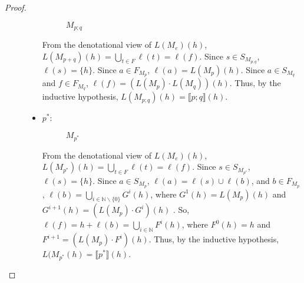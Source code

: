\documentclass{article}
\newcommand\den[1]{\llbracket #1\rrbracket}
\renewcommand\star{^{\textstyle *}}
\begin{document}
\begin{proof}
\begin{description}
\begin{itemize}
\begin{figure}[H]
    \caption{$M_{p;q}$}
  \end{figure}
  
  From the denotational view of $L(M_e)(h)$,
  $L(M_{p+q})(h) = \bigcup_{t\in F}\ell(t) = \ell(f)$. Since 
  $s \in S_{M_{p;q}}$, $\ell(s) = \{h\}$. Since $a \in F_{M_p}$, 
  $\ell(a) = L(M_p)(h)$. Since $a \in S_{M_q}$ and $f \in F_{M_q}$,
  $\ell(f) = (L(M_p) \cdot L(M_q))(h)$. Thus, by the inductive hypothesis, 
  $L(M_{p;q})(h) = \den{p;q}(h)$.
  
  \item $p\star$:
  \begin{figure}[H]
    \centering
    \caption{$M_{p\star}$}
  \end{figure}
  
  From the denotational view of $L(M_e)(h)$,
  $L(M_{p\star})(h) = \bigcup_{t\in F}\ell(t) = \ell(f)$. Since 
  $s \in S_{M_{p\star}}$, $\ell(s) = \{h\}$. Since $a \in S_{M_p}$, 
  $\ell(a) = \ell(s) \cup \ell(b)$, and $b \in F_{M_p}$,
  $\ell(b) = \bigcup_{i \in \mathbb{N} \backslash \{0\}} G^i(h)$, where 
  $G^{1}(h) = L(M_p)(h)$ and $G^{i+1}(h) = (L(M_p) \cdot G^i)(h)$ . So,
  $\ell(f) = {h} + \ell(b) = \bigcup_{i \in \mathbb{N}} F^i(h)$, where 
  $F^{0}(h) = {h}$ and $F^{i+1} = (L(M_p) \cdot F^i)(h)$. Thus, by the
  inductive hypothesis, $L(M_{p\star}(h) = \den{p\star}(h)$.
\end{itemize}
\end{description}
\end{proof}
\end{document}
